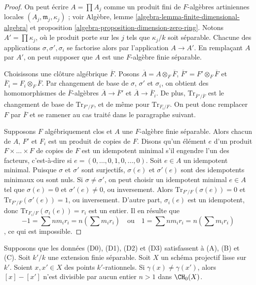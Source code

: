 \begin{proof}
On peut écrire $A = \prod A_j$ comme un produit fini de
$F$-algèbres artiniennes locales $(A_j, \mathfrak m_j, \kappa_j)$ ; voir
Algèbre, lemme \ref{algebra-lemma-finite-dimensional-algebra} et
proposition \ref{algebra-proposition-dimension-zero-ring}.
Notons $A' = \prod \kappa_j$, où le produit porte sur les $j$
tels que $\kappa_j/k$ soit séparable. Chacune des applications
$\sigma, \sigma', \sigma_i$ se factorise alors par l'application
$A \to A'$. En remplaçant $A$ par $A'$, on peut supposer
que $A$ est une $F$-algèbre finie séparable.

\medskip\noindent
Choisissons une clôture algébrique $\overline{F}$. Posons
$\overline{A} = A \otimes_F \overline{F}$,
$\overline{F}' = F' \otimes_F \overline{F}$ et
$\overline{F}_i = F_i \otimes_F \overline{F}$.
Par changement de base de $\sigma$, $\sigma'$ et $\sigma_i$,
on obtient des homomorphismes de $\overline{F}$-algèbres $\overline{A} \to \overline{F}'$
et $\overline{A} \to \overline{F}_i$. De plus,
$\text{Tr}_{\overline{F}'/\overline{F}}$ est le changement de base
de $\text{Tr}_{F'/F}$, et de même pour
$\text{Tr}_{F_i/F}$. On peut donc remplacer
$F$ par $\overline{F}$ et se ramener au cas traité
dans le paragraphe suivant.

\medskip\noindent
Supposons $F$ algébriquement clos et $A$ une $F$-algèbre finie séparable.
Alors chacun de $A$, $F'$ et $F_i$ est un produit de copies de $F$.
Disons qu'un élément $e$ d'un produit
$F \times \ldots \times F$ de copies de $F$ est un idempotent minimal
s'il engendre l'un des facteurs, c'est-à-dire si
$e = (0, \ldots, 0, 1, 0, \ldots, 0)$. Soit $e \in A$ un idempotent minimal.
Puisque $\sigma$ et $\sigma'$
sont surjectifs, $\sigma(e)$ et $\sigma'(e)$ sont des idempotents
minimaux ou sont nuls. Si $\sigma \not = \sigma'$, on peut choisir
un idempotent minimal $e \in A$ tel que $\sigma(e) = 0$ et
$\sigma'(e) \not = 0$, ou inversement. Alors
$\text{Tr}_{F'/F}(\sigma(e)) = 0$ et
$\text{Tr}_{F'/F}(\sigma'(e)) = 1$, ou inversement.
D'autre part, $\sigma_i(e)$ est un idempotent,
donc $\text{Tr}_{F_i/F}(\sigma_i(e)) = r_i$ est un entier.
Il en résulte que
$$
-1 = \sum n m_i r_i = n (\sum m_i r_i)
\quad\text{ou}\quad
1 = \sum n m_i r_i = n (\sum m_i r_i)
$$,
ce qui est impossible.
\end{proof}

\begin{lemma}
\label{lemma-relations-classes-points}
Supposons que les données (D0), (D1), (D2) et (D3) satisfassent à (A), (B) et (C).
Soit $k'/k$ une extension finie séparable.
Soit $X$ un schéma projectif lisse sur $k'$.
Soient $x, x' \in X$ des points $k'$-rationnels.
Si $\gamma(x) \not = \gamma(x')$, alors
$[x] - [x']$ n'est divisible par aucun entier $n > 1$ dans $\CH_0(X)$.
\end{lemma}

